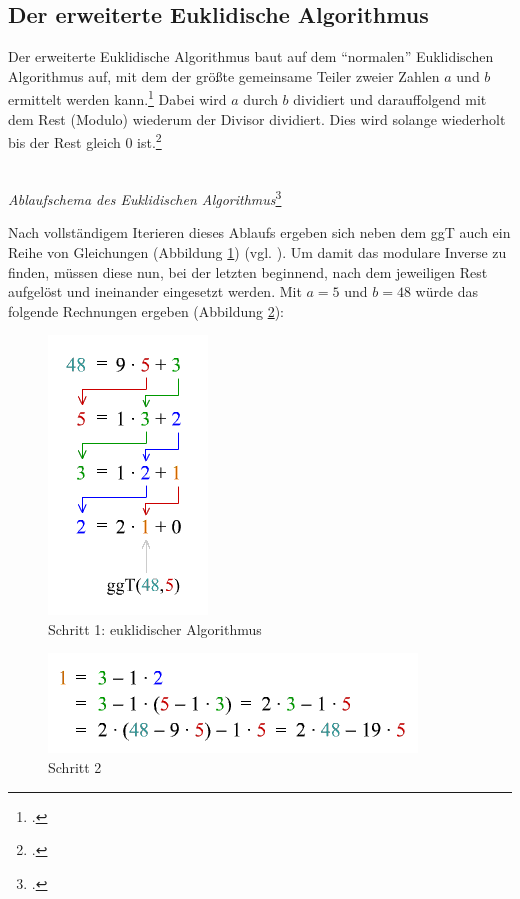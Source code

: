 \documentclass{scrarticle}
\begin{document}
        \subsection{Der erweiterte Euklidische Algorithmus}
            Der erweiterte Euklidische Algorithmus baut auf dem \enquote{normalen} Euklidischen Algorithmus auf, mit dem der größte gemeinsame Teiler zweier Zahlen $a$ und $b$ ermittelt werden kann.\footcite[vgl.][]{erweA} Dabei wird $a$ durch $b$ dividiert und darauffolgend mit dem Rest (Modulo) wiederum der Divisor dividiert. Dies wird solange wiederholt bis der Rest gleich $0$ ist.\footcite[vgl.][]{matbib-eka}
            \begin{center}
            \\
            \emph{Ablaufschema des Euklidischen Algorithmus}\footcite[vgl.][]{zum2020}\\                   
            \end{center}
            Nach vollständigem Iterieren dieses Ablaufs ergeben sich neben dem ggT auch ein Reihe von Gleichungen (Abbildung \ref{fig:euklid}) (vgl. \cite{erweA}). Um damit das modulare Inverse zu finden, müssen diese nun, bei der letzten beginnend, nach dem jeweiligen Rest aufgelöst und ineinander eingesetzt werden. Mit $a=5$ und $b=48$ würde das folgende Rechnungen ergeben (Abbildung \ref{fig:erweuklid}):\\
            \begin{figure}[h!]
                \centering
                \includegraphics{content/euklid.png}
                \caption{Schritt 1: euklidischer Algorithmus\protect\footnotemark}
                \label{fig:euklid}
            \end{figure}
            \begin{figure}[h!]
                \centering
                \includegraphics{content/erweuklid.png}
                \caption{Schritt 2\protect\footnotemark}
                \label{fig:erweuklid}
            \end{figure}
\end{document}
